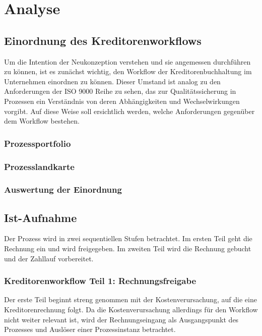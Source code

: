 \chapter{Analyse}

\section{Einordnung des Kreditorenworkflows}
Um die Intention der Neukonzeption verstehen und sie angemessen durchführen zu können, ist es zunächst wichtig, den Workflow der Kreditorenbuchhaltung im Unternehmen einordnen zu können. 
Dieser Umstand ist analog zu den Anforderungen der ISO 9000 Reihe zu sehen, das zur Qualitätssicherung in Prozessen ein Verständnis von deren Abhängigkeiten und Wechselwirkungen vorgibt. 
Auf diese Weise soll ersichtlich werden, welche Anforderungen gegenüber dem Workflow bestehen.

\subsection{Prozessportfolio}

\subsection{Prozesslandkarte}

\subsection{Auswertung der Einordnung}





\section{Ist-Aufnahme}
Der Prozess wird in zwei sequentiellen Stufen betrachtet. 
Im ersten Teil geht die Rechnung  ein und wird freigegeben.
Im zweiten Teil wird die Rechnung gebucht und der Zahllauf vorbereitet.
\subsection{Kreditorenworkflow Teil 1: Rechnungsfreigabe}
Der erste Teil beginnt streng genommen mit der Kostenverursachung, auf die eine Kreditorenrechnung folgt. 
Da die Kostenverursachung allerdings für den Workflow nicht weiter relevant ist, wird der Rechnungseingang als Ausgangspunkt des Prozesses und Auslöser einer Prozessinstanz betrachtet. 
